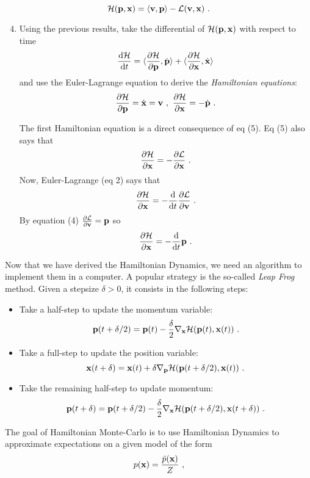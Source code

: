\documentclass{article}
\newcommand{\xx}{{\bf x}}
\newcommand{\pp}{{\bf p}}
\newcommand{\vv}{{\bf v}}
\begin{document}
\begin{equation}
\mathcal{H}(\pp, \xx) = \langle \vv, \pp \rangle - \mathcal{L}(\vv,\xx)~.
\end{equation}
\begin{enumerate}
\setcounter{enumi}{3}
\item Using the previous results, take the differential of $\mathcal{H}(\pp,\xx)$ with respect to time
$$\frac{\mathrm{d} \mathcal{H}}{\mathrm{d}t} = \langle \frac{\partial \mathcal{H}}{\partial \pp}, \dot{\pp} \rangle + \langle \frac{\partial \mathcal{H}}{\partial \xx} ,\dot{\xx} \rangle $$
and use the Euler-Lagrange equation to derive the \emph{Hamiltonian equations}:
\begin{equation}
\frac{\partial \mathcal{H}}{\partial \pp} = \dot{\xx}=\vv ~,~ \frac{\partial \mathcal{H}}{\partial \xx} = -\dot{\pp}~. 
\end{equation}

{\color{blue}
The first Hamiltonian equation is a direct consequence of eq (5). 
Eq (5) also says that 
$$\frac{\partial \mathcal{H}}{\partial \xx} = - \frac{\partial \mathcal{L}}{\partial \xx}~.$$
Now, Euler-Lagrange (eq 2) says that 
$$\frac{\partial \mathcal{H}}{\partial \xx} = - \frac{\mathrm{d}}{\mathrm{d}t} \frac{\partial \mathcal{L}}{\partial \vv}~.$$
By equation (4) $ \frac{\partial \mathcal{L}}{\partial \vv} =\pp$ so 
$$\frac{\partial \mathcal{H}}{\partial \xx} = - \frac{\mathrm{d}}{\mathrm{d}t} \pp~.$$
 }
\end{enumerate}
Now that we have derived the Hamiltonian Dynamics, we need an algorithm to implement them in a computer. 
A popular strategy is the so-called \emph{Leap Frog} method. Given a stepsize $\delta > 0$, it consists in the following steps:
\begin{itemize}
\item Take a half-step to update the momentum variable: $$\pp( t + \delta/2) = \pp(t) - \frac{\delta}{2} \nabla_{\xx} \mathcal{H}(\pp(t), \xx(t))~.$$
\item Take a full-step to update the position variable: $$\xx( t + \delta) = \xx(t) + \delta \nabla_{\pp} \mathcal{H}(\pp(t+\delta/2), \xx(t))~.$$
\item Take the remaining half-step to update momentum: $$\pp( t + \delta) = \pp(t+\delta/2) - \frac{\delta}{2} \nabla_{\xx} \mathcal{H}(\pp(t+\delta/2), \xx(t+\delta))~.$$
\end{itemize}
The goal of Hamiltonian Monte-Carlo is to use Hamiltonian Dynamics to approximate expectations 
on a given model of the form 
\begin{equation}
\label{blabla}
p(\xx) = \frac{\tilde{p}(\xx)}{Z}~,
\end{equation}
\end{document}
